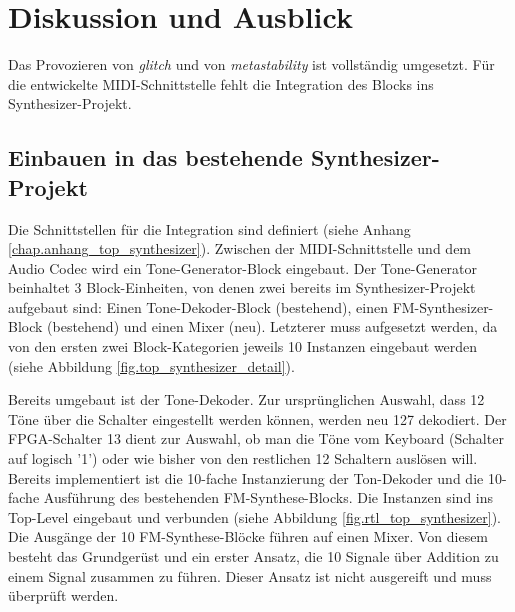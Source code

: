 
\chapter{Diskussion und Ausblick}\label{chap.diskussion}

Das Provozieren von \textit{glitch} und von \textit{metastability} ist vollständig umgesetzt. Für die entwickelte MIDI-Schnittstelle fehlt die Integration des Blocks ins Synthesizer-Projekt. 

\section{Einbauen in das bestehende Synthesizer-Projekt}

Die Schnittstellen für die Integration sind definiert (siehe Anhang \ref{chap.anhang_top_synthesizer}). Zwischen der MIDI-Schnittstelle und dem Audio Codec wird ein Tone-Generator-Block eingebaut. Der Tone-Generator beinhaltet 3 Block-Einheiten, von denen zwei bereits im Synthesizer-Projekt aufgebaut sind: Einen Tone-Dekoder-Block (bestehend), einen FM-Synthesizer-Block (bestehend) und einen Mixer (neu). Letzterer muss aufgesetzt werden, da von den ersten zwei Block-Kategorien jeweils 10 Instanzen eingebaut werden (siehe Abbildung \ref{fig.top_synthesizer_detail}). 

Bereits umgebaut ist der Tone-Dekoder. Zur ursprünglichen Auswahl, dass 12 Töne über die Schalter eingestellt werden können, werden neu 127 dekodiert. Der FPGA-Schalter 13 dient zur Auswahl, ob man die Töne vom Keyboard (Schalter auf logisch '1') oder wie bisher von den restlichen 12 Schaltern auslösen will.\\
Bereits implementiert ist die 10-fache Instanzierung der Ton-Dekoder und die 10-fache Ausführung des bestehenden FM-Synthese-Blocks. Die Instanzen sind ins Top-Level eingebaut und verbunden (siehe Abbildung \ref{fig.rtl_top_synthesizer}). Die Ausgänge der 10 FM-Synthese-Blöcke führen auf einen Mixer. Von diesem besteht das Grundgerüst und ein erster Ansatz, die 10 Signale über Addition zu einem Signal zusammen zu führen. Dieser Ansatz ist nicht ausgereift und muss überprüft werden.

